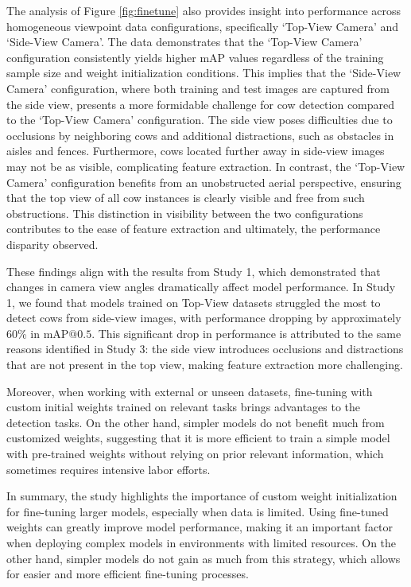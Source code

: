 The analysis of Figure \ref{fig:finetune} also provides insight into performance across homogeneous viewpoint data configurations, specifically `Top-View Camera' and `Side-View Camera'. The data demonstrates that the `Top-View Camera' configuration consistently yields higher mAP values regardless of the training sample size and weight initialization conditions. This implies that the `Side-View Camera' configuration, where both training and test images are captured from the side view, presents a more formidable challenge for cow detection compared to the `Top-View Camera' configuration. The side view poses difficulties due to occlusions by neighboring cows and additional distractions, such as obstacles in aisles and fences. Furthermore, cows located further away in side-view images may not be as visible, complicating feature extraction. In contrast, the `Top-View Camera' configuration benefits from an unobstructed aerial perspective, ensuring that the top view of all cow instances is clearly visible and free from such obstructions. This distinction in visibility between the two configurations contributes to the ease of feature extraction and ultimately, the performance disparity observed.

These findings align with the results from Study 1, which demonstrated that changes in camera view angles dramatically affect model performance. In Study 1, we found that models trained on Top-View datasets struggled the most to detect cows from side-view images, with performance dropping by approximately 60\% in $\text{mAP@{0.5}}$. This significant drop in performance is attributed to the same reasons identified in Study 3: the side view introduces occlusions and distractions that are not present in the top view, making feature extraction more challenging.

Moreover, when working with external or unseen datasets, fine-tuning with custom initial weights trained on relevant tasks brings advantages to the detection tasks. On the other hand, simpler models do not benefit much from customized weights, suggesting that it is more efficient to train a simple model with pre-trained weights without relying on prior relevant information, which sometimes requires intensive labor efforts.

In summary, the study highlights the importance of custom weight initialization for fine-tuning larger models, especially when data is limited. Using fine-tuned weights can greatly improve model performance, making it an important factor when deploying complex models in environments with limited resources. On the other hand, simpler models do not gain as much from this strategy, which allows for easier and more efficient fine-tuning processes.

